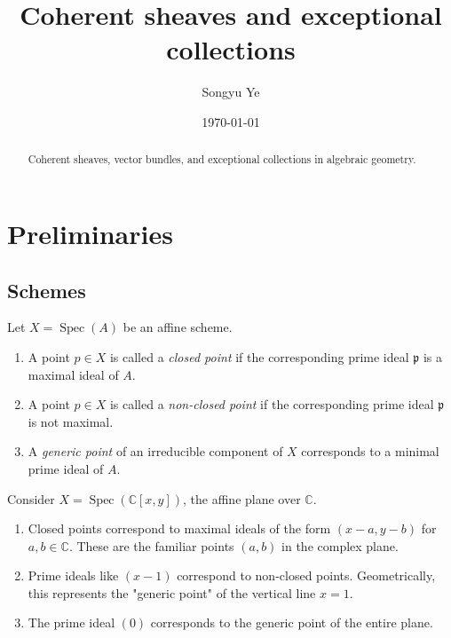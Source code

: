 \documentclass[12pt]{article}
\begin{document}
\rhead{\today}
\cfoot{\thepage}

\title{Coherent sheaves and exceptional collections}
\author{Songyu Ye}
\date{\today}

\maketitle

\begin{abstract}
    Coherent sheaves, vector bundles, and exceptional collections in algebraic geometry.
\end{abstract}

\tableofcontents



\section{Preliminaries}
\subsection{Schemes}
\begin{definition}
    Let $X = \operatorname{Spec}(A)$ be an affine scheme.
    \begin{enumerate}
        \item A point $p \in X$ is called a \textit{closed point} if the corresponding prime ideal $\mathfrak{p}$ is a maximal ideal of $A$.
        \item A point $p \in X$ is called a \textit{non-closed point} if the corresponding prime ideal $\mathfrak{p}$ is not maximal.
        \item A \textit{generic point} of an irreducible component of $X$ corresponds to a minimal prime ideal of $A$.
    \end{enumerate}
\end{definition}

\begin{example}
    Consider $X = \operatorname{Spec}(\mathbb{C}[x,y])$, the affine plane over $\mathbb{C}$.
    \begin{enumerate}
        \item Closed points correspond to maximal ideals of the form $(x-a, y-b)$ for $a, b \in \mathbb{C}$. These are the familiar points $(a,b)$ in the complex plane.
        \item Prime ideals like $(x-1)$ correspond to non-closed points. Geometrically, this represents the "generic point" of the vertical line $x=1$.
        \item The prime ideal $(0)$ corresponds to the generic point of the entire plane.
    \end{enumerate}
\end{example}
\end{document}

